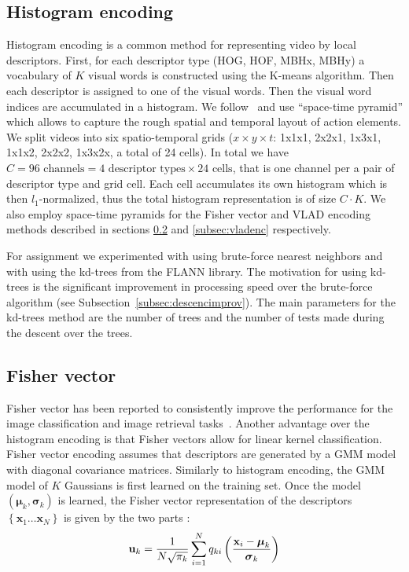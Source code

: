 \documentclass[10pt,twocolumn,letterpaper]{article}
\begin{document}
\subsection{Histogram encoding}
\label{subsec:histenc}
Histogram encoding is a common method for representing video by local descriptors. First, for each descriptor type (HOG, HOF, MBHx, MBHy) a vocabulary of $K$ visual words is constructed using the K-means algorithm. Then each descriptor is assigned to one of the visual words. Then the visual word indices are accumulated in a histogram. We follow~\cite{Laptev08} and use ``space-time pyramid'' which allows to capture the rough spatial and temporal layout of action elements. We split videos into six spatio-temporal grids ($x\times y \times t$: 1x1x1, 2x2x1, 1x3x1, 1x1x2, 2x2x2, 1x3x2x, a total of 24 cells). In total we have $C=96\text{ channels} = 4 \text{ descriptor types}\times 24\text{ cells}$, that is one channel per a pair of descriptor type and grid cell. Each cell accumulates its own histogram which is then $l_1$-normalized, thus the total histogram representation is of size $C\cdot K$. We also employ space-time pyramids for the Fisher vector and VLAD encoding methods described in sections \ref{subsec:fvenc} and \ref{subsec:vladenc} respectively.

For assignment we experimented with using brute-force nearest neighbors and with using the kd-trees from the FLANN library. The motivation for using kd-trees is the significant improvement in processing speed over the brute-force algorithm (see Subsection~\ref{subsec:descencimprov}). The main parameters for the kd-trees method are the number of trees and the number of tests  made during the descent over the trees. 

\subsection{Fisher vector}
\label{subsec:fvenc}
Fisher vector has been reported to consistently improve the performance for the image classification and image retrieval tasks~\cite{Jegou12}. Another advantage over the histogram encoding is that Fisher vectors allow for linear kernel classification. Fisher vector encoding assumes that descriptors are generated by a GMM model with diagonal covariance matrices. Similarly to histogram encoding, the GMM model of $K$ Gaussians is first learned on the training set. 
Once the model $\left(\boldsymbol\mu_k, \boldsymbol\sigma_k\right)$ is learned, the Fisher vector representation of the descriptors $\left\{\textbf{x}_1\dots \textbf{x}_N\right\}$ is given by the two parts \cite{Perronnin10}:
$${\textbf u}_k = \frac{1}{N\sqrt{\pi_k}}\sum_{i=1}^{N}q_{ki}\left(\frac{\textbf{x}_i-\boldsymbol\mu_k}{\boldsymbol\sigma_k}\right)$$
\end{document}
